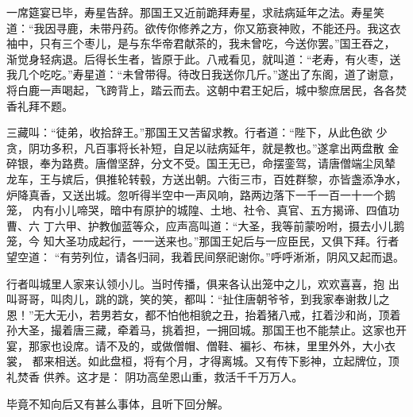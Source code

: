 一席筵宴已毕，寿星告辞。那国王又近前跪拜寿星，求祛病延年之法。寿星笑
道：“我因寻鹿，未带丹药。欲传你修养之方，你又筋衰神败，不能还丹。我这衣
袖中，只有三个枣儿，是与东华帝君献茶的，我未曾吃，今送你罢。”国王吞之，
渐觉身轻病退。后得长生者，皆原于此。八戒看见，就叫道：“老寿，有火枣，送
我几个吃吃。”寿星道：“未曾带得。待改日我送你几斤。”遂出了东阁，道了谢意，
将白鹿一声喝起，飞跨背上，踏云而去。这朝中君王妃后，城中黎庶居民，各各焚
香礼拜不题。

三藏叫：“徒弟，收拾辞王。”那国王又苦留求教。行者道：“陛下，从此色欲
少贪，阴功多积，凡百事将长补短，自足以祛病延年，就是教也。”遂拿出两盘散
金碎银，奉为路费。唐僧坚辞，分文不受。国王无已，命摆銮驾，请唐僧端尘凤辇
龙车，王与嫔后，俱推轮转毂，方送出朝。六街三市，百姓群黎，亦皆盏添净水，
炉降真香，又送出城。忽听得半空中一声风响，路两边落下一千一百一十一个鹅笼，
内有小儿啼哭，暗中有原护的城隍、土地、社令、真官、五方揭谛、四值功曹、六
丁六甲、护教伽蓝等众，应声高叫道：“大圣，我等前蒙吩咐，摄去小儿鹅笼，今
知大圣功成起行，一一送来也。”那国王妃后与一应臣民，又俱下拜。行者望空道：
“有劳列位，请各归祠，我着民间祭祀谢你。”呼呼淅淅，阴风又起而退。

行者叫城里人家来认领小儿。当时传播，俱来各认出笼中之儿，欢欢喜喜，抱
出叫哥哥，叫肉儿，跳的跳，笑的笑，都叫：“扯住唐朝爷爷，到我家奉谢救儿之
恩！”无大无小，若男若女，都不怕他相貌之丑，抬着猪八戒，扛着沙和尚，顶着
孙大圣，撮着唐三藏，牵着马，挑着担，一拥回城。那国王也不能禁止。这家也开
宴，那家也设席。请不及的，或做僧帽、僧鞋、褊衫、布袜，里里外外，大小衣裳，
都来相送。如此盘桓，将有个月，才得离城。又有传下影神，立起牌位，顶礼焚香
供养。这才是：
阴功高垒恩山重，救活千千万万人。

毕竟不知向后又有甚么事体，且听下回分解。